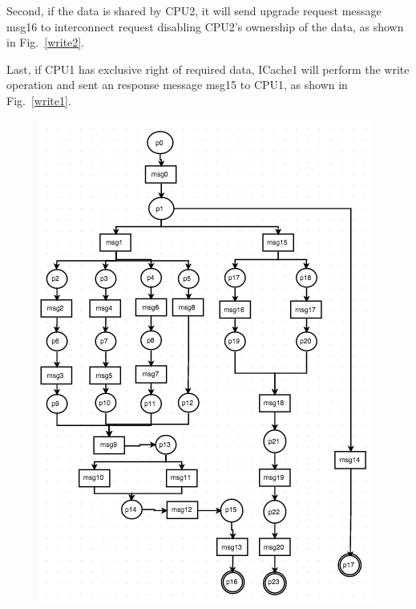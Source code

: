 \documentclass[conference]{IEEEtran}
\begin{document}
Second, if the data is shared by CPU2, it will send upgrade request message msg16 to interconnect request disabling  CPU2's ownership of the data, as shown in Fig.~\ref{write2}. 

Last, if CPU1 has exclusive right of required data, ICache1 will perform the write operation and sent an response message msg15 to CPU1, as shown in Fig.~\ref{write1}.


\begin{figure} 
 \centerline{
 \includegraphics[width=3.4In]{figures/Fig5.png}}
 

\end{figure}
\end{document}
